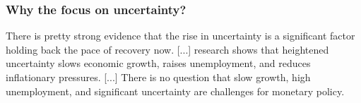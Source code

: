 \documentclass[handout,english]{beamer}
\begin{document}
\begin{frame}
\frametitle{Why the focus on uncertainty?}

There is pretty strong evidence that the rise in uncertainty is a significant factor holding back the pace of recovery now. [...] research shows that heightened uncertainty slows economic growth, raises unemployment, and reduces inflationary pressures. [...] There is no question that slow growth, high unemployment, and significant uncertainty are challenges for monetary policy.
\end{frame}

%
%
\end{document}
